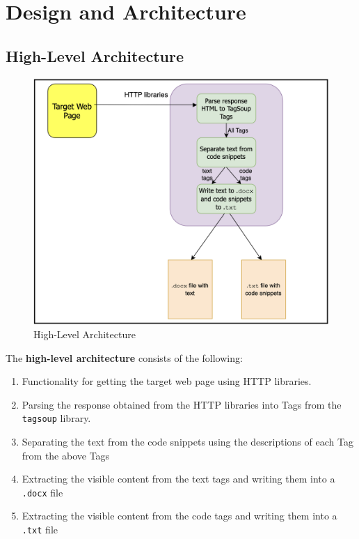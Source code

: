 \documentclass{scrreprt}
\begin{document}
\chapter{Design and Architecture}


\section{High-Level Architecture}

\begin{figure}[h]
    \centering
    \includegraphics[width=1.0\textwidth]{figures/high-arch.png}
    \caption{High-Level Architecture}
    \label{fig:high-level-arch}
\end{figure}

The \textbf{high-level architecture} consists of the following:
\begin{enumerate}
    \item Functionality for getting the target web page using HTTP libraries.
    \item Parsing the response obtained from the HTTP libraries into Tags from the \texttt{tagsoup} library.
    \item Separating the text from the code snippets using the descriptions of each Tag from the above Tags
    \item Extracting the visible content from the text tags and writing them into a \texttt{.docx} file
    \item Extracting the visible content from the code tags and writing them into a \texttt{.txt} file
\end{enumerate}
\end{document}
